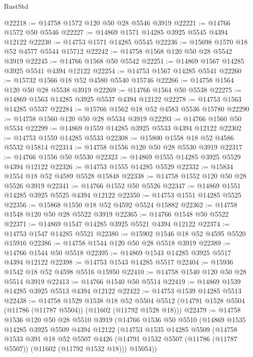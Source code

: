 \begin{lexlean}{RustStd}
\begin{coremodule}
@22218 := @14758 @1572 @120 @50 @28 @5546 @3919
@22221 := @14766 @1572 @50 @5546
@22227 := @14869 @1571 @14285 @3925 @5545 @4394 @12122
@22230 := @14753 @1571 @14285 @5545
@22236 := @15698 @1570 @18 @52 @4577 @5544 @15712
@22242 := @14758 @1568 @120 @50 @28 @5542 @3919
@22245 := @14766 @1568 @50 @5542
@22251 := @14869 @1567 @14285 @3925 @5541 @4394 @12122
@22254 := @14753 @1567 @14285 @5541
@22260 := @15732 @1566 @18 @52 @4580 @5540 @15746
@22266 := @14758 @1564 @120 @50 @28 @5538 @3919
@22269 := @14766 @1564 @50 @5538
@22275 := @14869 @1563 @14285 @3925 @5537 @4394 @12122
@22278 := @14753 @1563 @14285 @5537
@22284 := @15766 @1562 @18 @52 @4583 @5536 @15780
@22290 := @14758 @1560 @120 @50 @28 @5534 @3919
@22293 := @14766 @1560 @50 @5534
@22299 := @14869 @1559 @14285 @3925 @5533 @4394 @12122
@22302 := @14753 @1559 @14285 @5533
@22308 := @15800 @1558 @18 @52 @4586 @5532 @15814
@22314 := @14758 @1556 @120 @50 @28 @5530 @3919
@22317 := @14766 @1556 @50 @5530
@22323 := @14869 @1555 @14285 @3925 @5529 @4394 @12122
@22326 := @14753 @1555 @14285 @5529
@22332 := @15834 @1554 @18 @52 @4589 @5528 @15848
@22338 := @14758 @1552 @120 @50 @28 @5526 @3919
@22341 := @14766 @1552 @50 @5526
@22347 := @14869 @1551 @14285 @3925 @5525 @4394 @12122
@22350 := @14753 @1551 @14285 @5525
@22356 := @15868 @1550 @18 @52 @4592 @5524 @15882
@22362 := @14758 @1548 @120 @50 @28 @5522 @3919
@22365 := @14766 @1548 @50 @5522
@22371 := @14869 @1547 @14285 @3925 @5521 @4394 @12122
@22374 := @14753 @1547 @14285 @5521
@22380 := @15902 @1546 @18 @52 @4595 @5520 @15916
@22386 := @14758 @1544 @120 @50 @28 @5518 @3919
@22389 := @14766 @1544 @50 @5518
@22395 := @14869 @1543 @14285 @3925 @5517 @4394 @12122
@22398 := @14753 @1543 @14285 @5517
@22404 := @15936 @1542 @18 @52 @4598 @5516 @15950
@22410 := @14758 @1540 @120 @50 @28 @5514 @3919
@22413 := @14766 @1540 @50 @5514
@22419 := @14869 @1539 @14285 @3925 @5513 @4394 @12122
@22422 := @14753 @1539 @14285 @5513
@22438 := @14758
    @1529
    @1538
    @18
    @52
    @5504
    @5512
    (@14791 @1528 @5504 (@11786 (@11787 @5504)) (@11602 (@11792 @1528 @18)))
@22479 := @14758
    @1536
    @120
    @50
    @28
    @5510
    @3919
    (@14766
      @1536
      @50
      @5510
      (@14869
        @1535
        @14285
        @3925
        @5509
        @4394
        @12122
        (@14753
          @1535
          @14285
          @5509
          (@14758
            @1533
            @391
            @18
            @52
            @5507
            @4426
            (@14791 @1532 @5507 (@11786 (@11787 @5507)) (@11602 (@11792 @1532 @18)))
            @15054))

\end{coremodule}
\end{lexlean}
